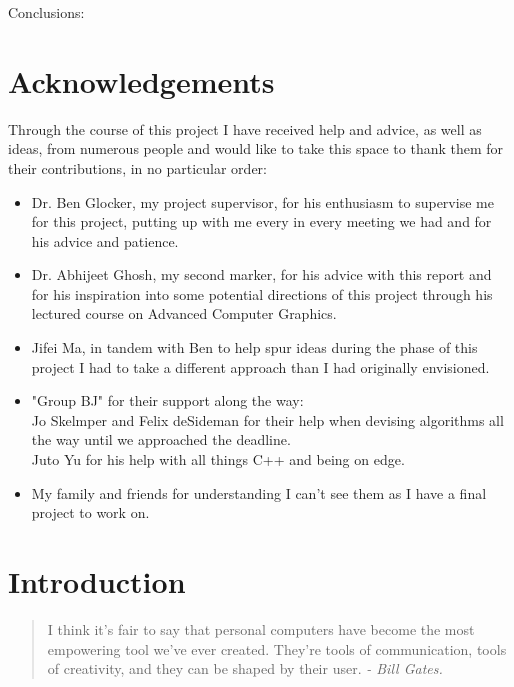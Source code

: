 \documentclass[11pt]{article}
\begin{document}
Conclusions:


\newpage
\section*{Acknowledgements}
Through the course of this project I have received help and advice, as
well as ideas, from numerous people and would like to take this space
to thank them for their contributions, in no particular order:
\begin{itemize}
	\item Dr. Ben Glocker, my project supervisor, for his enthusiasm
		  to supervise me for this project, putting up with me every 
		  in every meeting we had and for his advice and patience.
	\item Dr. Abhijeet Ghosh, my second marker, for his advice with
		  this report and for his inspiration into some potential
		  directions of this project through his lectured course on
		  Advanced Computer Graphics.
	\item Jifei Ma, in tandem with Ben to help spur ideas during the
		  phase of this project I had to take a different approach than
		  I had originally envisioned.
	\item "Group BJ" for their support along the way: \\
		  Jo Skelmper and Felix deSideman for their help when devising
		  algorithms all the way until we approached the deadline.\\
		  Juto Yu for his help with all things C++ and being on edge.
	\item My family and friends for understanding I can't see them as I
		  have a final project to work on.
\end{itemize}

\newpage
\tableofcontents
\newpage

\section{Introduction}
\begin{quote}
I think it's fair to say that personal computers have become
		the most empowering tool we've ever created. They're tools of
		communication, tools of creativity, and they can be shaped by
		their user. \textit{- Bill Gates.}		
\end{quote}
\end{document}
